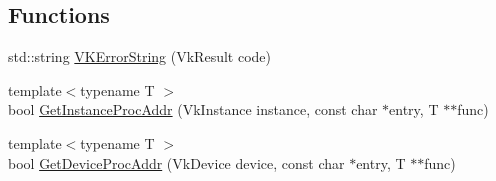 \subsection*{Functions}
\begin{DoxyCompactItemize}
\item 
std\+::string \hyperlink{namespaceHatchit_1_1Graphics_1_1Vulkan_a508fca46fa82bcd24b927122f620a0e4}{V\+K\+Error\+String} (Vk\+Result code)
\item 
{\footnotesize template$<$typename T $>$ }\\bool \hyperlink{namespaceHatchit_1_1Graphics_1_1Vulkan_ac758954ba925ee56611645476a8684d7}{Get\+Instance\+Proc\+Addr} (Vk\+Instance instance, const char $\ast$entry, T $\ast$$\ast$func)
\item 
{\footnotesize template$<$typename T $>$ }\\bool \hyperlink{namespaceHatchit_1_1Graphics_1_1Vulkan_af31c4f324639b40e64dc2f75a76e3d84}{Get\+Device\+Proc\+Addr} (Vk\+Device device, const char $\ast$entry, T $\ast$$\ast$func)
\end{DoxyCompactItemize}
